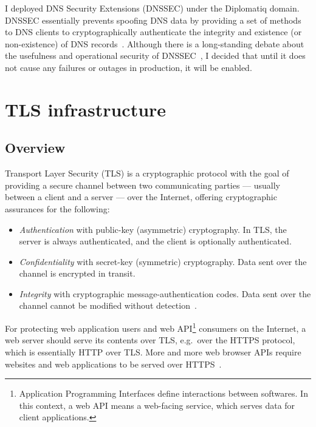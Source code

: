 I deployed DNS Security Extensions (DNSSEC) under the Diplomatiq domain. DNSSEC essentially prevents spoofing DNS data by providing a set of methods to DNS clients to cryptographically authenticate the integrity and existence (or non-existence) of DNS records~\cite{rfc4033}. Although there is a long-standing debate about the usefulness and operational security of DNSSEC~\cite{4159821, ptacek-dnssec-rant-2, ptacek-dnssec-rant-1}, I decided that until it does not cause any failures or outages in production, it will be enabled.

\section{TLS infrastructure}

\subsection{Overview}

Transport Layer Security (TLS) is a cryptographic protocol with the goal of providing a secure channel between two communicating parties — usually between a client and a server — over the Internet, offering cryptographic assurances for the following:

\begin{itemize}
\item \emph{Authentication} with public-key (asymmetric) cryptography. In TLS, the server is always authenticated, and the client is optionally authenticated.
\item \emph{Confidentiality} with secret-key (symmetric) cryptography. Data sent over the channel is encrypted in transit.
\item \emph{Integrity} with cryptographic message-authentication codes. Data sent over the channel cannot be modified without detection~\cite{rfc8446}.
\end{itemize}

For protecting web application users and web API\footnote{Application Programming Interfaces define interactions between softwares. In this context, a web API means a web-facing service, which serves data for client applications.} consumers on the Internet, a web server should serve its contents over TLS, e.g.\ over the HTTPS protocol, which is essentially HTTP over TLS. More and more web browser APIs require websites and web applications to be served over HTTPS~\cite{secure-context-features}.

